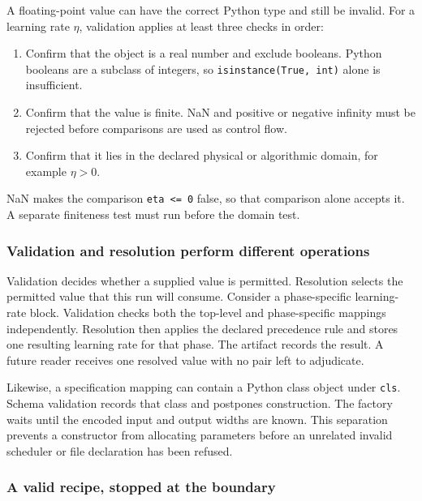 \documentclass[10pt,aps,prd,twocolumn,nofootinbib]{revtex4-2}
\newcommand{\code}[1]{\texttt{#1}}
\begin{document}
A floating-point value can have the correct Python type and still be invalid.
For a learning rate $\eta$, validation applies at least three checks in
order:
\begin{enumerate}
  \item Confirm that the object is a real number and exclude booleans.  Python
        booleans are a subclass of integers, so
        \code{isinstance(True, int)} alone is insufficient.
  \item Confirm that the value is finite.  NaN and positive or negative infinity must be
        rejected before comparisons are used as control flow.
  \item Confirm that it lies in the declared physical or algorithmic domain,
        for example $\eta>0$.
\end{enumerate}
NaN makes the comparison \code{eta <= 0} false, so that comparison alone
accepts it.  A separate finiteness test must run before the domain test.

\subsubsection{Validation and resolution perform different operations}

Validation decides whether a supplied value is permitted.  Resolution selects
the permitted value that this run will consume.  Consider a
phase-specific learning-rate block.  Validation checks both the top-level and
phase-specific mappings independently.  Resolution then applies the declared
precedence rule and stores one resulting learning rate for that phase.  The
artifact records the result.  A future reader receives one resolved value with
no pair left to adjudicate.

Likewise, a specification mapping can contain a Python class object under
\code{cls}.  Schema validation records that class and postpones construction.
The factory waits until the encoded input and output widths are known.  This
separation prevents a constructor from allocating parameters before an
unrelated invalid scheduler or file declaration has been refused.

\subsubsection{A valid recipe, stopped at the boundary}
\end{document}
